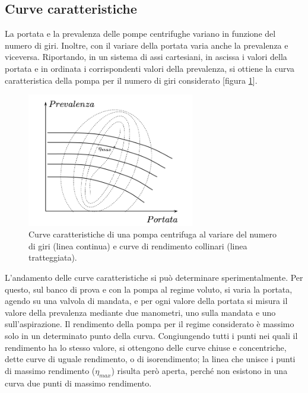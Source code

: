 \documentclass[laurea,oneside,11pt]{USiena_tesiLM}
\begin{document}
\subsection{Curve caratteristiche}
La portata e la prevalenza delle pompe centrifughe variano in funzione del numero di giri. Inoltre, con il variare della portata varia anche la prevalenza e viceversa. Riportando, in un sistema di assi cartesiani, in ascissa i valori della portata e in ordinata i corrispondenti valori della prevalenza, si ottiene la curva caratteristica della pompa per il numero di giri considerato [figura \ref{fig:curve_car}].

\begin{figure}[!ht]
\centering
\includegraphics[width=0.65\textwidth]{figure/curve_car} 
\caption{Curve caratteristiche di una pompa centrifuga al variare del numero di giri (linea continua) e curve di rendimento collinari (linea tratteggiata).}
\label{fig:curve_car}
\end{figure}

L'andamento delle curve caratteristiche si può determinare sperimentalmente.
Per questo, sul banco di prova e con la pompa al regime voluto, si varia la portata, agendo
su una valvola di mandata, e per ogni valore della portata si misura il valore della
prevalenza mediante due manometri, uno sulla mandata e uno sull'aspirazione.
Il rendimento della pompa per il regime considerato è massimo solo in un determinato punto della curva.
Congiungendo tutti i punti nei quali il rendimento ha lo stesso valore, si ottengono delle curve chiuse e concentriche, dette curve di uguale rendimento, o di isorendimento; la linea che unisce i punti di massimo rendimento ($\eta_{max}$) risulta però aperta, perché non esistono in una curva due punti di massimo rendimento.
\end{document}
